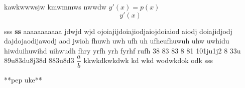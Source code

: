 \documentclass{article}
\begin{document}
kawkwwwsjw kmwmmws nwwdw $y'(x) = p(x) $ 
\[ y'(x) \] 

sss 
\textbf{ss} 
aaaaaaaaaaa jdwjd wjd ojoiajijdoiajiodjaiojdoiaiod aiodj doiajidjodj dajdojaodijawodj aod jwioh fhuwh uwh ufh uh ufheufhuwuh uhw uwhidu hiwduihuwihd uihwudh fhry yrfh yrh fyrhf rufh 38 83 83 8 81 101ju1j2 8 33u 89u83du8j38d 883u8d3 $\dfrac{a}{b} $ kkwkdkwkdwk kd wkd wodwkdok odk sss 

**pep uke** 
\end{document}
